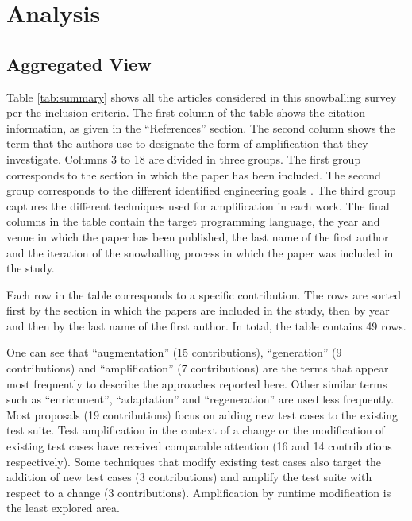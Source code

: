 \section{Analysis}
\label{sec:sota:analysis}

\subsection{Aggregated View}
\label{subsec:sota:analysis:aggregated-view}



Table \ref{tab:summary} shows all the articles considered in this snowballing survey per the inclusion criteria.
The first column of the table shows the citation information, as given in the ``References'' section. 
The second column shows the term that the authors use to designate the form of amplification that they investigate. 
Columns 3 to 18 are divided in three groups.
The first group corresponds to the section in which the paper has been included. 
The second group corresponds to the different identified engineering goals . 
The third group captures the different techniques used for amplification in each work. 
The final columns in the table contain the target programming language, the year and venue in which the paper has been published, the last name of the first author and the iteration of the snowballing process in which the paper was included in the study.

Each row in the table corresponds to a specific contribution.
The rows are sorted first by the section in which the papers are included in the study, then by year and then by the last name of the first author. 
In total, the table contains 49 rows.

One can see that ``augmentation'' (15 contributions), ``generation'' (9 contributions) and ``amplification'' (7 contributions) are the  terms that appear most frequently to describe the approaches reported here. 
Other similar terms such as ``enrichment'', ``adaptation'' and  ``regeneration'' are used less frequently. 
Most proposals (19 contributions) focus on adding new test cases to the existing test suite. 
Test amplification in the context of a change or the modification of existing test cases have received comparable attention (16 and 14 contributions respectively). 
Some techniques that modify existing test cases also target the addition of new test cases (3 contributions) and amplify the test suite with respect to a change (3 contributions). 
Amplification by runtime modification is the least explored area.

